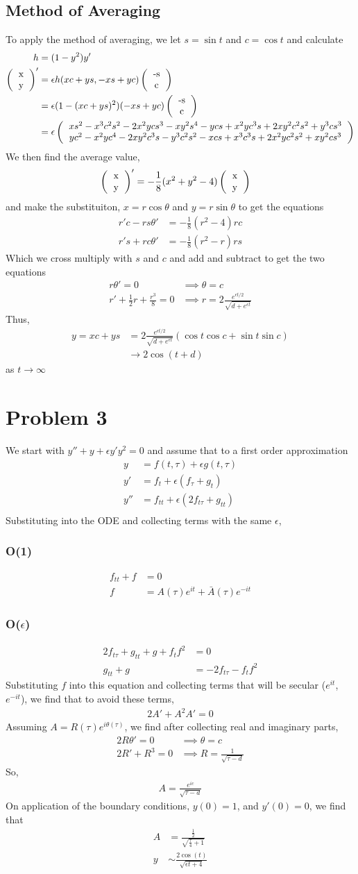 \documentclass[12pt]{article}
\newcommand{\eq}[1]{\begin{align*}#1\end{align*}}
\newcommand{\ve}[2]{\left(\begin{tabular}{c}#1 \\ #2\end{tabular}\right)}
\begin{document}
\subsection*{Method of Averaging}
To apply the method of averaging, we let $s = \sin t$ and $c = \cos t$ and calculate
\eq{
	h &= (1-y^2)y'\\
	\ve{x}{y}' &= \epsilon h(x c + y s, -x s + y c)\ve{-s}{c}\\
	&= \epsilon(1 -(xc + ys)^2)(-xs + yc)\ve{-s}{c}\\
	&= \epsilon\ve{
		$xs^2 - x^3c^2s^2 - 2 x^2ycs^3 - xy^2s^4 - ycs + x^2yc^3s + 2xy^2c^2s^2 + y^3cs^3$
	}{
		$yc^2-x^2yc^4 - 2xy^2c^3s - y^3c^2s^2 - xcs + x^3c^3s + 2x^2yc^2s^2 + xy^2cs^3$
	}
}
We then find the average value,
\eq{
	\ve{x}{y}' &= -\frac{1}{8}(x^2 + y^2 - 4)\ve{x}{y}
}
and make the substituiton, $x = r\cos\theta$ and $y = r\sin\theta$ to get the equations
\eq{
	r'c - rs\theta' &= -\frac{1}{8}(r^2 - 4)rc\\
	r's + rc\theta' &= -\frac{1}{8}(r^2 - r)rs
}
Which we cross multiply with $s$ and $c$ and add and subtract to get the two equations
\eq{
	r\theta' = 0 &\implies \theta = c\\
	r' + \frac{1}{2}r + \frac{r^3}{8} = 0 &\implies r = 2\frac{e^{\epsilon t/2}}{\sqrt{d + e^{\epsilon t}}}
}
Thus,
\eq{
	y = xc + ys &= 2\frac{e^{\epsilon t/2}}{\sqrt{d + e^{\epsilon t}}}(\cos t \cos c + \sin t \sin c)\\
	&\rightarrow 2\cos(t+d)
}
as $t\rightarrow\infty$
\section*{Problem 3}
We start with $y'' + y + \epsilon y'y^2 = 0$ and assume that to a first order approximation
\eq{
	y &= f(t,\tau) + \epsilon g(t,\tau)\\
	y' &= f_t + \epsilon(f_\tau + g_t)\\
	y'' &= f_{tt} + \epsilon(2f_{t\tau} + g_{tt})\\
}
Substituting into the ODE and collecting terms with the same $\epsilon$,
\subsubsection*{O(1)}
\eq{
	f_{tt} + f &= 0\\
	f &= A(\tau)e^{it} + \bar{A}(\tau)e^{-it}
}
\subsubsection*{O($\epsilon$)}
\eq{
	2f_{t\tau} + g_{tt} + g + f_tf^2 &= 0\\
	g_{tt} + g &= -2f_{t\tau} - f_tf^2
}
Substituting $f$ into this equation and collecting terms that will be secular ($e^{it}$, $e^{-it}$), we find that to avoid these terms,
\eq{
	2A'+ A^2A' = 0
}
Assuming $A = R(\tau)e^{i\theta(\tau)}$, we find after collecting real and imaginary parts,
\eq{
	2R\theta' = 0 &\implies \theta = c\\
	2R' + R^3 = 0 &\implies R = \frac{1}{\sqrt{\tau - d}}
}
So,
\eq{
	A = \frac{e^{ic}}{\sqrt{\tau - d}}
}
On application of the boundary conditions, $y(0) = 1$, and $y'(0) = 0$, we find that
\eq{
	A &= \frac{\frac{1}{2}}{\sqrt{\frac{\tau}{4} + 1}}\\
	y &\sim \frac{2\cos(t)}{\sqrt{\epsilon t + 4}}
}
\end{document}
